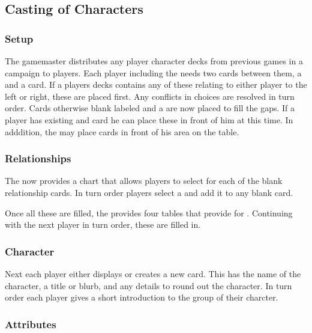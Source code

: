 \subsection{Casting of Characters}

\subsubsection{Setup}

The gamemaster distributes any player character decks from previous games in a campaign to players. Each player including the  needs two  cards between them, a  and a  card. If a players decks contains any of these relating to either player to the left or right, these are placed first. Any conflicts in choices are resolved in turn order. Cards otherwise blank labeled  and a  are now placed to fill the gaps. If a player has existing  and  card he can place these in front of him at this time. In adddition, the  may place  cards in front of his area on the table.

\subsubsection{Relationships}

The  now provides a chart that allows players to select  for each of the blank relationship cards. In turn order players select a  and add it to any blank card.

Once all these are filled, the  provides four tables that provide  for . Continuing with the next player in turn order, these are filled in.

\subsubsection{Character}

Next each player either displays or creates a new  card. This has the name of the character, a title or blurb, and any details to round out the character. In turn order each player gives a short introduction to the group of their charcter.

\subsubsection{Attributes}


